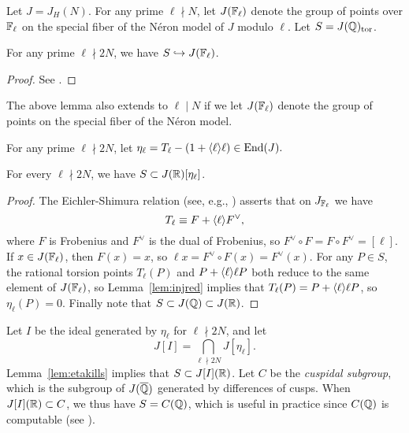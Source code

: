 \documentclass{article}
\begin{document}
Let $J = J_H(N)$. For any prime $\ell\nmid N$, let $J(\mathbb{F}_{\ell})$ denote the
group of points over $\mathbb{F}_{\ell}$ on the special fiber of the N\'eron model of
$J$ modulo $\ell$. Let $S = J(\mathbb{Q})_{\operatorname{tor}}$.

\begin{lemma}\label{lem:injred}
  For any prime $\ell \nmid 2N$, we have $S\hookrightarrow
  J(\mathbb{F}_{\ell})$.
\end{lemma}
\begin{proof}
  See \cite[Appendix]{katz:torsion}.
\end{proof}
\begin{remark}
  The above lemma also extends to $\ell\mid N$ if we let
  $J(\mathbb{F}_{\ell})$ denote the group of points on the special fiber of
  the N\'eron model.
\end{remark}

For any prime $\ell\nmid 2N$, let
$
  \eta_{\ell} = T_{\ell} - (1+\langle\ell\rangle \ell) \in \operatorname{End}(J).
$
\begin{lemma}\label{lem:etakills}
For every $\ell\nmid 2N$,
we have $S \subset J(\mathbb{R})[\eta_{\ell}]$.
\end{lemma}
\begin{proof}
The Eichler-Shimura relation (see, e.g., \cite[Thm.~5.16]{ribet-stein:serre})
asserts that on $J_{\mathbb{F}_{\ell}}$ we have
$$
 T_{\ell} \equiv F + \langle\ell\rangle F^{\vee},
$$
where $F$ is Frobenius and $F^{\vee}$ is the dual of Frobenius, so
$F^{\vee} \circ F = F \circ F^{\vee} = [\ell]$.
If $x \in J(\mathbb{F}_{\ell})$, then $F(x)=x$, so $\ell x = F^{\vee} \circ
F(x) = F^{\vee}(x)$.  For any $P\in S$, the rational torsion points
$T_{\ell}(P)$ and $P + \langle\ell\rangle \ell P$ both reduce to the same
element of $J(\mathbb{F}_{\ell})$, so Lemma~\ref{lem:injred} implies that
$T_{\ell}(P) = P + \langle\ell\rangle \ell P$, so $\eta_{\ell}(P) = 0$.
Finally note that $S\subset J(\mathbb{Q})\subset J(\mathbb{R})$.
\end{proof}

Let $I$ be the ideal generated by $\eta_{\ell}$ for $\ell\nmid 2N$,
and let $$J[I] = \bigcap_{\ell\nmid 2N} J[\eta_{\ell}].$$
Lemma~\ref{lem:etakills} implies that $S \subset J[I](\mathbb{R})$.  Let $C$ be
the {\em cuspidal subgroup}, which is the subgroup of $J(\overline{\mathbb{Q}})$
generated by differences of cusps. When $J[I](\mathbb{R})\subset C$, we thus have
$S=C(\mathbb{Q})$, which is useful in practice since $C(\mathbb{Q})$ is computable
(see \cite{stevens:thesis}).
\end{document}

